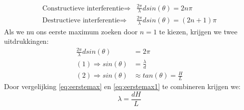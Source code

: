 \documentclass[a4paper,kul]{kulakarticle} %
\begin{document}
\begin{align*}
	\text{Constructieve interferentie}\Rightarrow&\frac{2\pi}{\lambda}dsin(\theta) = 2n\pi\\
	\text{Destructieve interferentie}\Rightarrow&\frac{2\pi}{\lambda}dsin(\theta) = (2n+1)\pi
\end{align*}
Als we nu ons eerste maximum zoeken door $n = 1$ te kiezen, krijgen we twee uitdrukkingen:
\begin{align}
	\frac{2\pi}{\lambda}dsin(\theta) &= 2\pi\\
	\label{eq:eerstemax}
	(1)\Rightarrow sin(\theta) &= \frac{\lambda}{d}\\
	\label{eq:eerstemax1}
	(2)\Rightarrow sin(\theta) &\approx tan(\theta) = \frac{H}{L}
\end{align}
Door vergelijking \ref{eq:eerstemax} en \ref{eq:eerstemax1} te combineren krijgen we:
\begin{equation}
	\label{eq:lambdadingen}
	\lambda=\frac{dH}{L}
\end{equation}
\newpage
\end{document}
